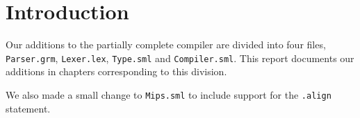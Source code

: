 \section{Introduction}
Our additions to the partially complete compiler are divided into four
files, {\tt Parser.grm}, {\tt Lexer.lex}, {\tt Type.sml} and {\tt Compiler.sml}.
This report documents our additions in chapters corresponding to this division.

We also made a small change to {\tt Mips.sml} to include support for the
{\tt .align} statement.
